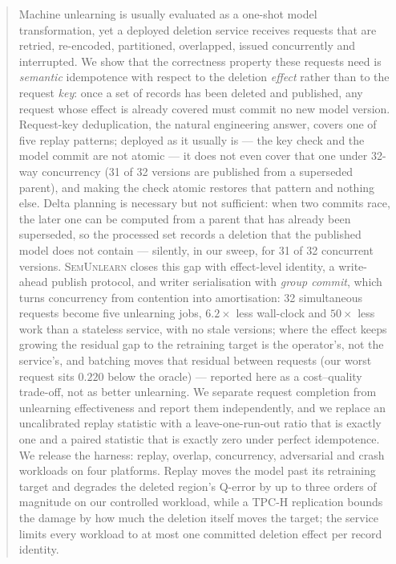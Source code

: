 \documentclass[conference]{IEEEtran}
\newcommand{\sys}{\textsc{SemUnlearn}}
\begin{document}
\begin{abstract}
Machine unlearning is usually evaluated as a one-shot model transformation, yet a
deployed deletion service receives requests that are retried, re-encoded, partitioned,
overlapped, issued concurrently and interrupted.  We show that the correctness property
these requests need is \emph{semantic} idempotence with respect to the deletion
\emph{effect} rather than to the request \emph{key}: once a set of records has been
deleted and published, any request whose effect is already covered must commit no new
model version.  Request-key deduplication, the natural engineering answer, covers one
of five replay patterns; deployed as it usually is --- the key check and the model
commit are not atomic --- it does not even cover that one under 32-way concurrency
(31 of 32 versions are published from a superseded parent), and making the check atomic
restores that pattern and nothing else.  Delta planning is necessary but not sufficient:
when two commits race, the later one can be computed from a parent that has already
been superseded, so the processed set records a deletion that the published model does
not contain --- silently, in our sweep, for 31 of 32 concurrent versions.  \sys{}
closes this gap with effect-level identity, a write-ahead publish protocol, and writer
serialisation with \emph{group commit}, which turns concurrency from contention into
amortisation: 32 simultaneous requests become five unlearning jobs, $6.2\times$ less
wall-clock and $50\times$ less work than a stateless service, with no stale versions;
where the effect keeps growing the residual gap to the retraining target is the
operator's, not the service's, and batching moves that residual between requests (our
worst request sits $0.220$ below the oracle) --- reported here as a cost--quality
trade-off, not as better unlearning.  We separate request completion from unlearning
effectiveness and report them independently, and we replace an uncalibrated replay statistic
with a leave-one-run-out ratio that is exactly one and a paired statistic that is exactly zero
under perfect idempotence.  We release the harness: replay, overlap, concurrency, adversarial
and crash
workloads on four platforms.  Replay moves the model past its retraining target and degrades the deleted region's Q-error by
up to three orders of magnitude on our controlled workload, while a TPC-H replication bounds
the damage by how much the deletion itself moves the target; the service
limits every workload to at most one committed deletion effect per record identity.
\end{abstract}
\end{document}
